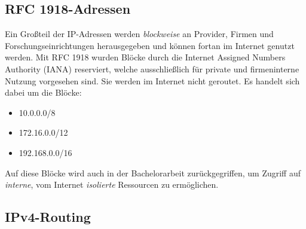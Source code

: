 \subsection{RFC 1918-Adressen}
Ein Großteil der IP-Adressen werden \textit{blockweise} an Provider, Firmen und Forschungseinrichtungen herausgegeben und können fortan im Internet genutzt werden. Mit \gls{RFC} 1918 wurden Blöcke durch die Internet Assigned Numbers Authority (IANA) reserviert, welche ausschließlich für private und firmeninterne Nutzung vorgesehen sind\cite{rfc1918}. Sie werden im Internet nicht geroutet. Es handelt sich dabei um die Blöcke:
\begin{itemize}
\item 10.0.0.0/8
\item 172.16.0.0/12
\item 192.168.0.0/16
\end{itemize}

Auf diese Blöcke wird auch in der Bachelorarbeit zurückgegriffen, um Zugriff auf \textit{interne}, vom Internet \textit{isolierte} Ressourcen zu ermöglichen.

\subsection{IPv4-Routing}

